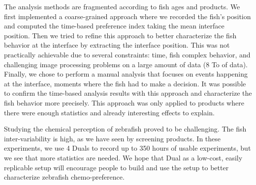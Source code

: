   The analysis methods are fragmented according to fish ages and products. We first implemented a coarse-grained approach where we recorded the fish's position and computed the time-based preference index taking the mean interface position. Then we tried to refine this approach to better characterize the fish behavior at the interface by extracting the interface position. This was not practically achievable due to several constraints: time, fish complex behavior, and challenging image processing problems on a large amount of data (8 To of data). Finally, we chose to perform a manual analysis that focuses on events happening at the interface, moments where the fish had to make a decision. It was possible to confirm the time-based analysis results with this approach and characterize the fish behavior more precisely. This approach was only applied to products where there were enough statistics and already interesting effects to explain.

 Studying the chemical perception of zebrafish proved to be challenging. The fish inter-variability is high, as we have seen by screening products. In these experiments, we use 4 Duals to record up to 350 hours of usable experiments, but we see that more statistics are needed. We hope that Dual as a low-cost, easily replicable setup will encourage people to build and use the setup to better characterize zebrafish chemo-preference.




